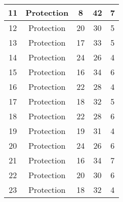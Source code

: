 \documentclass[results.tex]{subfiles}
\begin{document}
\begin{center}
\begin{tabular}{| c || c | c | c | c |}
            \hline
            11                      & Protection                   & 8                      & 42                      & 7                    \\
            \hline
            12                      & Protection                   & 20                     & 30                      & 5                    \\
            \hline
            13                      & Protection                   & 17                     & 33                      & 5                    \\
            \hline
            14                      & Protection                   & 24                     & 26                      & 4                    \\
            \hline
            15                      & Protection                   & 16                     & 34                      & 6                    \\
            \hline
            16                      & Protection                   & 22                     & 28                      & 4                    \\
            \hline
            17                      & Protection                   & 18                     & 32                      & 5                    \\
            \hline
            18                      & Protection                   & 22                     & 28                      & 6                    \\
            \hline
            19                      & Protection                   & 19                     & 31                      & 4                    \\
            \hline
            20                      & Protection                   & 24                     & 26                      & 6                    \\
            \hline
            21                      & Protection                   & 16                     & 34                      & 7                    \\
            \hline
            22                      & Protection                   & 20                     & 30                      & 6                    \\
            \hline
            23                      & Protection                   & 18                     & 32                      & 4                    \\

\end{tabular}
\end{center}
\end{document}
